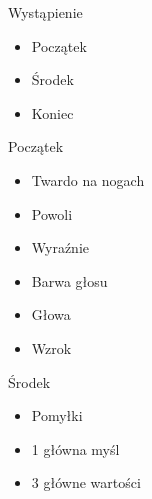 \documentclass{beamer}
\begin{document}
\begin{frame}{}
	\begin{center}
		\Huge{Wystąpienie}
	\end{center}
\end{frame}

\begin{frame}{}
	\begin{Large}
		\begin{itemize}
			\item Początek
			\item Środek
			\item Koniec
		\end{itemize}
	\end{Large}
\end{frame}

\begin{frame}{}
	\begin{center}
		\Huge{Początek}
	\end{center}
\end{frame}

\begin{frame}{}
	\begin{Large}
		\begin{itemize}
			\item Twardo na nogach
			\item Powoli
			\item Wyraźnie
			\item Barwa głosu
			\item Głowa
			\item Wzrok
		\end{itemize}
	\end{Large}
\end{frame}

\begin{frame}{}
	\begin{center}
		\Huge{Środek}
	\end{center}
\end{frame}

\begin{frame}{}
	\begin{Large}
		\begin{itemize}
			\item Pomyłki
			\item 1 główna myśl
			\item 3 główne wartości
		\end{itemize}
	\end{Large}
\end{frame}
\end{document}
